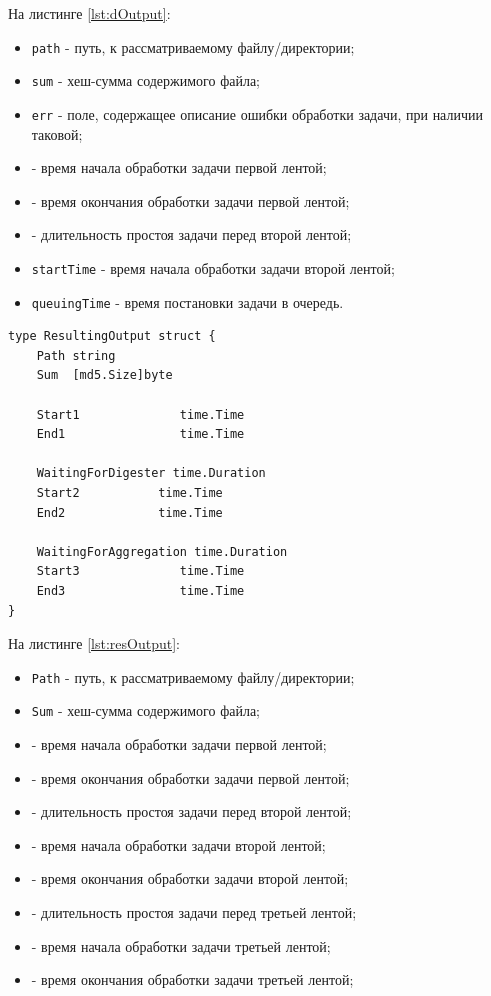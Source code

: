 На листинге \ref{lst:dOutput}:
\begin{itemize}
	\item \texttt{path} - путь, к рассматриваемому файлу/директории;
	\item \texttt{sum} - хеш-сумма содержимого файла;
	\item \texttt{err} - поле, содержащее описание ошибки обработки задачи, при наличии таковой;\
	
	\item {} - время начала обработки задачи первой лентой;
	\item {} - время окончания обработки задачи первой лентой;

	\item {} - длительность простоя задачи перед второй лентой;
	\item \texttt{startTime} - время начала обработки задачи второй лентой;
	\item \texttt{queuingTime} - время постановки задачи в очередь.
\end{itemize}
	

\begin{lstlisting}[label=lst:resOutput,caption={Определение типов данных. ResultingOutput}]
type ResultingOutput struct {
	Path string
	Sum  [md5.Size]byte

	Start1              time.Time
	End1                time.Time

	WaitingForDigester time.Duration
	Start2           time.Time
	End2             time.Time

	WaitingForAggregation time.Duration
	Start3              time.Time
	End3                time.Time
}
\end{lstlisting}
	
На листинге \ref{lst:resOutput}:
\begin{itemize}
	\item \texttt{Path} - путь, к рассматриваемому файлу/директории;
	\item \texttt{Sum} - хеш-сумма содержимого файла;
	
	\item {} - время начала обработки задачи первой лентой;
	\item {} - время окончания обработки задачи первой лентой;

	\item {} - длительность простоя задачи перед второй лентой;
	\item {} - время начала обработки задачи второй лентой;
	\item {} - время окончания обработки задачи второй лентой;

	\item {} - длительность простоя задачи перед третьей лентой;
	\item {} - время начала обработки задачи третьей лентой;
	\item {} - время окончания обработки задачи третьей лентой;
\end{itemize}


